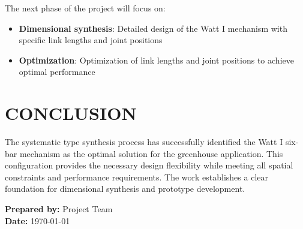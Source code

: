 \documentclass[12pt]{article}
\begin{document}
The next phase of the project will focus on:

\begin{itemize}
    \item \textbf{Dimensional synthesis}: Detailed design of the Watt I mechanism with specific link lengths and joint positions
    \item \textbf{Optimization}: Optimization of link lengths and joint positions to achieve optimal performance
\end{itemize}

\section*{CONCLUSION}

The systematic type synthesis process has successfully identified the Watt I six-bar mechanism as the optimal solution for the greenhouse application. This configuration provides the necessary design flexibility while meeting all spatial constraints and performance requirements. The work establishes a clear foundation for dimensional synthesis and prototype development.

\vspace{1cm}

\begin{center}
\textbf{Prepared by:} Project Team \\
\textbf{Date:} \today
\end{center}



\end{document}
